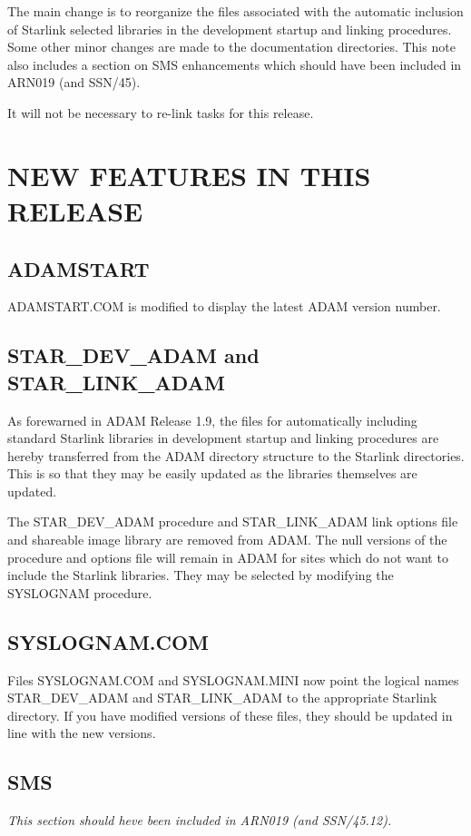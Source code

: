 The main change is to reorganize the files associated with the automatic 
inclusion of Starlink selected libraries in the development startup and 
linking procedures.
Some other minor changes are made to the documentation directories. This note
also includes a section on SMS enhancements which should have been included
in ARN019 (and SSN/45).

It will not be necessary to re-link tasks for this release.

\section{NEW FEATURES IN THIS RELEASE}

\subsection{ADAMSTART}
ADAMSTART.COM is modified to display the latest ADAM version number.

\subsection{STAR\_DEV\_ADAM and STAR\_LINK\_ADAM}
As forewarned in ADAM Release 1.9, the files for automatically including
standard Starlink libraries in development startup and linking procedures
are hereby transferred from the ADAM directory structure to the Starlink
directories. This is so that they may be easily updated as the libraries
themselves are updated.

The STAR\_DEV\_ADAM procedure and STAR\_LINK\_ADAM link options file and
shareable image library are removed from ADAM.
The null versions of the procedure and options file will remain 
in ADAM for sites which do not want to include the Starlink libraries.
They may be selected by modifying the SYSLOGNAM procedure.

\subsection{SYSLOGNAM.COM}
Files SYSLOGNAM.COM and SYSLOGNAM.MINI now point the logical
names STAR\_DEV\_ADAM and STAR\_LINK\_ADAM to the appropriate Starlink
directory.
If you have modified versions of these files, they should be updated in line
with the new versions.

\subsection{SMS}
{\em This section should heve been included in ARN019 (and SSN/45.12).}

